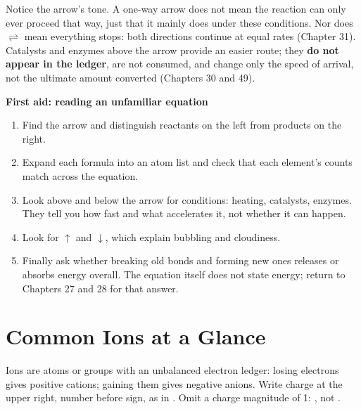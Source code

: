Notice the arrow's tone. A one-way arrow does not mean the reaction can only ever proceed that way, just that it mainly does under these conditions. Nor does $\rightleftharpoons$ mean everything stops: both directions continue at equal rates (Chapter 31). Catalysts and enzymes above the arrow provide an easier route; they \textbf{do not appear in the ledger}, are not consumed, and change only the speed of arrival, not the ultimate amount converted (Chapters 30 and 49).

\textbf{First aid: reading an unfamiliar equation}

\begin{enumerate}[itemsep=2pt]
\item Find the arrow and distinguish reactants on the left from products on the right.
\item Expand each formula into an atom list and check that each element's counts match across the equation.
\item Look above and below the arrow for conditions: heating, catalysts, enzymes. They tell you how fast and what accelerates it, not whether it can happen.
\item Look for $\uparrow$ and $\downarrow$, which explain bubbling and cloudiness.
\item Finally ask whether breaking old bonds and forming new ones releases or absorbs energy overall. The equation itself does not state energy; return to Chapters 27 and 28 for that answer.
\end{enumerate}

\section{Common Ions at a Glance}

Ions are atoms or groups with an unbalanced electron ledger: losing electrons gives positive cations; gaining them gives negative anions. Write charge at the upper right, number before sign, as in . Omit a charge magnitude of 1: , not .

